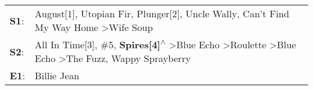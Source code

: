 \begin{supertabular}{p{0.03\textwidth}p{0.92\textwidth}}
 \textbf{S1}:  &                                                                                                                     August[1]\textsuperscript{}, \enspace Utopian Fir\textsuperscript{}, \enspace Plunger[2]\textsuperscript{}, \enspace Uncle Wally\textsuperscript{}, \enspace Can't Find My Way Home\textsuperscript{} \textgreater \enspace Wife Soup\textsuperscript{}  \enspace  \\
 \textbf{S2}:  &  All In Time[3]\textsuperscript{}, \enspace \#5\textsuperscript{}, \enspace \textbf{Spires[4]\textsuperscript{$\wedge$}} \textgreater \enspace Blue Echo\textsuperscript{} \textgreater \enspace Roulette\textsuperscript{} \textgreater \enspace Blue Echo\textsuperscript{} \textgreater \enspace The Fuzz\textsuperscript{}, \enspace Wappy Sprayberry\textsuperscript{}  \enspace  \\
 \textbf{E1}:  &                                                                                                                                                                                                                                                                                                                                               Billie Jean\textsuperscript{}  \enspace  \\
\end{supertabular}
